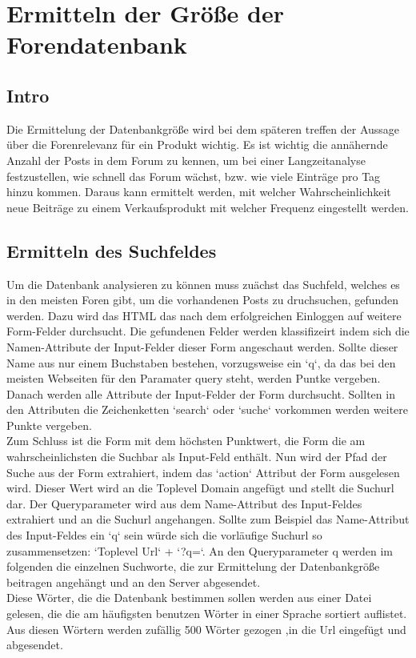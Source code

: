 \section{Ermitteln der Größe der Forendatenbank}
\subsection{Intro}
Die Ermittelung der Datenbankgröße wird bei dem späteren treffen der Aussage über die Forenrelevanz für ein Produkt wichtig.
Es ist wichtig die annähernde Anzahl der Posts in dem Forum zu kennen, um bei einer Langzeitanalyse festzustellen, wie schnell das Forum wächst, bzw. wie viele Einträge pro Tag hinzu kommen. Daraus kann ermittelt werden, mit welcher Wahrscheinlichkeit neue Beiträge zu einem Verkaufsprodukt mit welcher Frequenz eingestellt werden.\\
\subsection{Ermitteln des Suchfeldes}
Um die Datenbank analysieren zu können muss zuächst das Suchfeld, welches es in den meisten Foren gibt, um die vorhandenen Posts zu druchsuchen, gefunden werden.
Dazu wird das HTML das nach dem erfolgreichen Einloggen auf weitere Form-Felder durchsucht. Die gefundenen Felder werden klassifizeirt indem sich die Namen-Attribute der Input-Felder dieser Form angeschaut werden. Sollte dieser Name aus nur einem Buchstaben bestehen, vorzugsweise ein `q`, da das bei den meisten Webseiten für den Paramater query steht, werden Puntke vergeben.
Danach werden alle Attribute der Input-Felder der Form durchsucht. Sollten in den Attributen die Zeichenketten `search` oder `suche` vorkommen werden weitere Punkte vergeben.\\
Zum Schluss ist die Form mit dem höchsten Punktwert, die Form die am wahrscheinlichsten die Suchbar als Input-Feld enthält.
Nun wird der Pfad der Suche aus der Form extrahiert, indem das `action` Attribut der Form ausgelesen wird. Dieser Wert wird an die Toplevel Domain angefügt und stellt die Suchurl dar. Der Queryparameter wird aus dem Name-Attribut des Input-Feldes extrahiert und an die Suchurl angehangen. Sollte zum Beispiel das Name-Attribut des Input-Feldes ein `q` sein würde sich die vorläufige Suchurl so zusammensetzen: `Toplevel Url` + `?q=`. An den Queryparameter q werden im folgenden die einzelnen Suchworte, die zur Ermittelung der Datenbankgröße beitragen angehängt und an den Server abgesendet.\\
Diese Wörter, die die Datenbank bestimmen sollen werden aus einer Datei gelesen, die die am häufigsten benutzen Wörter in einer Sprache sortiert auflistet. Aus diesen Wörtern werden zufällig 500 Wörter gezogen ,in die Url eingefügt und abgesendet.\\

